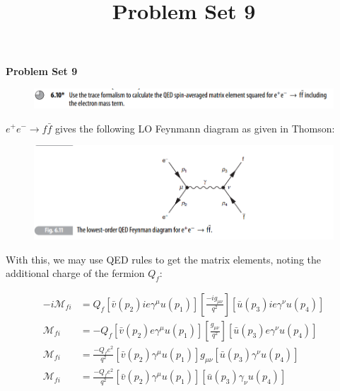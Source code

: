 \documentclass[11pt]{article}
\theoremstyle{definition}
\begin{document}
\setcounter{section}{2}
\title{Problem Set 9}

\pagestyle{fancy}
\fancyhf{}

\begin{center}
{\LARGE \bf Problem Set 9}\\
\end{center}

\begin{figure}[H]
    \centering
    \includegraphics[scale = 0.5]{6.10.png}
\end{figure}

$e^+e^- \to f\bar{f}$ gives the following LO Feynmann diagram as given in Thomson:

\begin{figure}[H]
    \centering
    \includegraphics[scale = 0.5]{fig 6.11.png}
\end{figure}

With this, we may use QED rules to get the matrix elements, noting the additional charge of the fermion $Q_f$:

\begin{align}
    -i\mathcal{M}_{fi} &= Q_f[\bar{v}(p_2)ie\gamma^{\mu}u(p_1)] 
    \left[ \frac{-ig_{\mu\nu}}{q^2} \right]
    [\bar{u}(p_3)ie\gamma^{\nu}u(p_4)]\\
    \mathcal{M}_{fi} &= -Q_f[\bar{v}(p_2)e\gamma^{\mu}u(p_1)] 
    \left[ \frac{g_{\mu\nu}}{q^2} \right]
    [\bar{u}(p_3)e\gamma^{\nu}u(p_4)]\\
    \mathcal{M}_{fi} &= \frac{-Q_fe^2}{q^2} [\bar{v}(p_2)\gamma^{\mu}u(p_1)]
    g_{\mu\nu}[\bar{u}(p_3)\gamma^{\nu}u(p_4)]\\
    \mathcal{M}_{fi} &= \frac{-Q_fe^2}{q^2} [\bar{v}(p_2)\gamma^{\mu}u(p_1)]
    [\bar{u}(p_3)\gamma_{\nu}u(p_4)]\\
\end{align}
\end{document}
